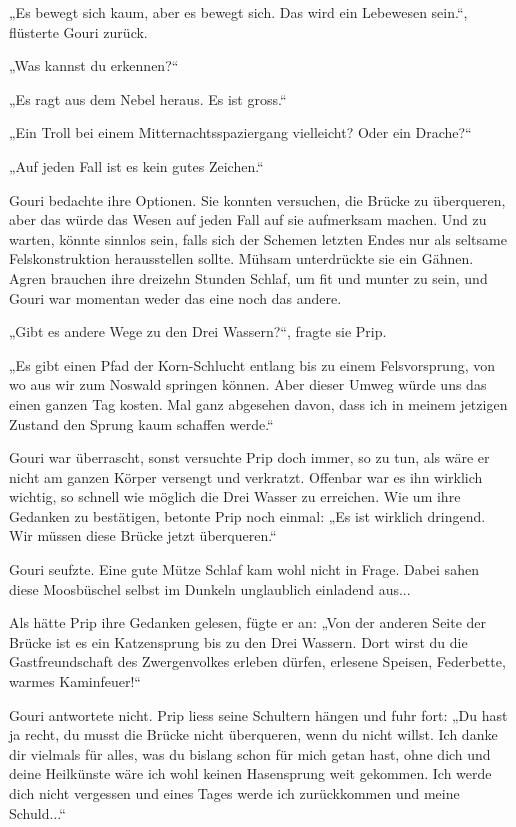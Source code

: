 „Es bewegt sich kaum, aber es bewegt sich. Das wird ein Lebewesen sein.“, flüsterte Gouri zurück.

„Was kannst du erkennen?“

„Es ragt aus dem Nebel heraus. Es ist gross.“

„Ein Troll bei einem Mitternachtsspaziergang vielleicht? Oder ein Drache?“

„Auf jeden Fall ist es kein gutes Zeichen.“

Gouri bedachte ihre Optionen. Sie konnten versuchen, die Brücke zu überqueren, aber das würde das Wesen auf jeden Fall auf sie aufmerksam machen. Und zu warten, könnte sinnlos sein, falls sich der Schemen letzten Endes nur als seltsame Felskonstruktion herausstellen sollte. Mühsam unterdrückte sie ein Gähnen. Agren brauchen ihre dreizehn Stunden Schlaf, um fit und munter zu sein, und Gouri war momentan weder das eine noch das andere.

„Gibt es andere Wege zu den Drei Wassern?“, fragte sie Prip.

„Es gibt einen Pfad der Korn-Schlucht entlang bis zu einem Felsvorsprung, von wo aus wir zum Noswald springen können. Aber dieser Umweg würde uns das einen ganzen Tag kosten. Mal ganz abgesehen davon, dass ich in meinem jetzigen Zustand den Sprung kaum schaffen werde.“

Gouri war überrascht, sonst versuchte Prip doch immer, so zu tun, als wäre er nicht am ganzen Körper versengt und verkratzt. Offenbar war es ihn wirklich wichtig, so schnell wie möglich die Drei Wasser zu erreichen. Wie um ihre Gedanken zu bestätigen, betonte Prip noch einmal: „Es ist wirklich dringend. Wir müssen diese Brücke jetzt überqueren.“

Gouri seufzte. Eine gute Mütze Schlaf kam wohl nicht in Frage. Dabei sahen diese Moosbüschel selbst im Dunkeln unglaublich einladend aus...

Als hätte Prip ihre Gedanken gelesen, fügte er an: „Von der anderen Seite der Brücke ist es ein Katzensprung bis zu den Drei Wassern. Dort wirst du die Gastfreundschaft des Zwergenvolkes erleben dürfen, erlesene Speisen, Federbette, warmes Kaminfeuer!“

Gouri antwortete nicht. Prip liess seine Schultern hängen und fuhr fort: „Du hast ja recht, du musst die Brücke nicht überqueren, wenn du nicht willst. Ich danke dir vielmals für alles, was du bislang schon für mich getan hast, ohne dich und deine Heilkünste wäre ich wohl keinen Hasensprung weit gekommen. Ich werde dich nicht vergessen und eines Tages werde ich zurückkommen und meine Schuld...“

